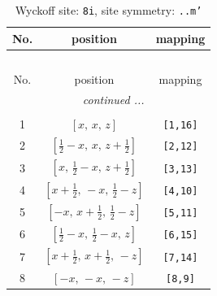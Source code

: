 \documentclass[fleqn,8pt]{jsarticle}
\begin{document}
\begin{longtable}{ccc}
\caption{Wyckoff site: {\tt 8i}, site symmetry: {\tt ..m'}}
 \\
 \hline \hline
No. & position & mapping \\ \hline \endfirsthead

\multicolumn{2}{l}{\tablename\ \thetable{}} \\
 \hline \hline
No. & position & mapping \\ \hline \endhead

 \hline \hline
\multicolumn{2}{r}{\footnotesize\it continued ...} \\ \endfoot

 \hline \hline
\multicolumn{2}{r}{} \\ \endlastfoot

1 & $\left[ x,\, x,\, z \right]$ & {\tt [1,16]} \\ \hline
2 & $\left[ \frac{1}{2} - x,\, x,\, z + \frac{1}{2} \right]$ & {\tt [2,12]} \\ \hline
3 & $\left[ x,\, \frac{1}{2} - x,\, z + \frac{1}{2} \right]$ & {\tt [3,13]} \\ \hline
4 & $\left[ x + \frac{1}{2},\, - x,\, \frac{1}{2} - z \right]$ & {\tt [4,10]} \\ \hline
5 & $\left[ - x,\, x + \frac{1}{2},\, \frac{1}{2} - z \right]$ & {\tt [5,11]} \\ \hline
6 & $\left[ \frac{1}{2} - x,\, \frac{1}{2} - x,\, z \right]$ & {\tt [6,15]} \\ \hline
7 & $\left[ x + \frac{1}{2},\, x + \frac{1}{2},\, - z \right]$ & {\tt [7,14]} \\ \hline
8 & $\left[ - x,\, - x,\, - z \right]$ & {\tt [8,9]} \\
\end{longtable}
\renewcommand{\arraystretch}{1.2}
\end{document}
